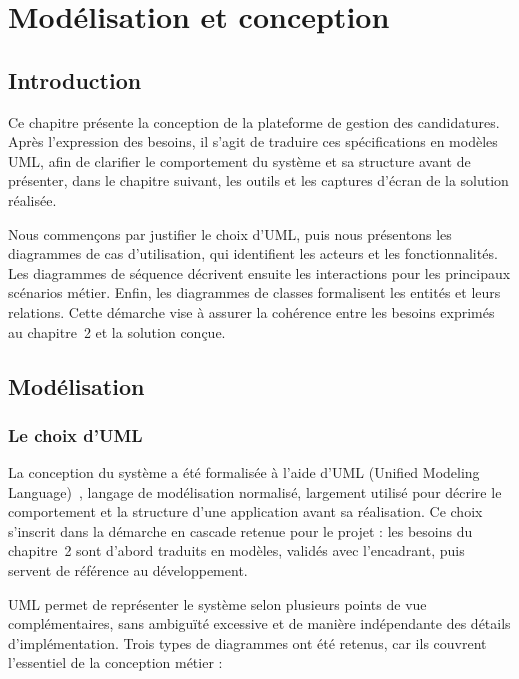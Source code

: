 \chapter{Modélisation et conception}
\thispagestyle{MyStyle}
\begin{onehalfspace}

\section{Introduction}

Ce chapitre présente la conception de la plateforme de gestion des candidatures. Après l'expression des besoins, il s'agit de traduire ces spécifications en modèles UML, afin de clarifier le comportement du système et sa structure avant de présenter, dans le chapitre suivant, les outils et les captures d'écran de la solution réalisée.

Nous commençons par justifier le choix d'UML, puis nous présentons les diagrammes de cas d'utilisation, qui identifient les acteurs et les fonctionnalités. Les diagrammes de séquence décrivent ensuite les interactions pour les principaux scénarios métier. Enfin, les diagrammes de classes formalisent les entités et leurs relations. Cette démarche vise à assurer la cohérence entre les besoins exprimés au chapitre~2 et la solution conçue.

\section{Modélisation}

\subsection{Le choix d'UML}

La conception du système a été formalisée à l'aide d'UML (Unified Modeling Language)~\cite{uml}, langage de modélisation normalisé, largement utilisé pour décrire le comportement et la structure d'une application avant sa réalisation. Ce choix s'inscrit dans la démarche en cascade retenue pour le projet : les besoins du chapitre~2 sont d'abord traduits en modèles, validés avec l'encadrant, puis servent de référence au développement.

UML permet de représenter le système selon plusieurs points de vue complémentaires, sans ambiguïté excessive et de manière indépendante des détails d'implémentation. Trois types de diagrammes ont été retenus, car ils couvrent l'essentiel de la conception métier :


\end{onehalfspace}
